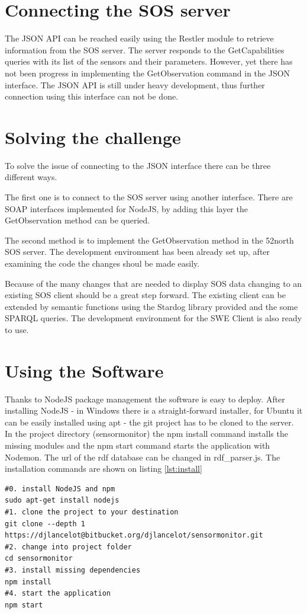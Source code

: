 
\section{Connecting the SOS server}

The JSON API can be reached easily using the Restler module to retrieve information from the SOS server. The server responds to the GetCapabilities queries with its list of the sensors and their parameters. However, yet there has not been progress in implementing the GetObservation command in the JSON interface. The JSON API is still under heavy development, thus further connection using this interface can not be done.

\section{Solving the challenge}

To solve the issue of connecting to the JSON interface there can be three different ways. 

The first one is to connect to the SOS server using another interface. There are SOAP interfaces implemented for NodeJS, by adding this layer the GetObservation method can be queried.

The second method is to implement the GetObservation method in the 52north SOS server. The development environment has been already set up, after examining the code the changes shoul be made easily. 

Because of the many changes that are needed to display SOS data changing to an existing SOS client should be a great step forward. The existing client can be extended by semantic functions using the Stardog library provided and the some SPARQL queries. The development environment for the SWE Client is also ready to use.

\section{Using the Software}

Thanks to NodeJS package management the software is easy to deploy. After installing NodeJS - in Windows there is a straight-forward installer, for Ubuntu it can be easily installed using apt - the git project has to be cloned to the server. In the project directory (sensormonitor)  the npm install command installs the missing modules and the npm start command starts the application with Nodemon. The url of the rdf database can be changed in rdf\_parser.js. The installation commands are shown on listing \ref{lst:install}

\begin{lstlisting}[caption={Install steps for the software\label{lst:install}}]
#0. install NodeJS and npm
sudo apt-get install nodejs
#1. clone the project to your destination
git clone --depth 1 https://djlancelot@bitbucket.org/djlancelot/sensormonitor.git
#2. change into project folder
cd sensormonitor
#3. install missing dependencies
npm install
#4. start the application
npm start
\end{lstlisting}